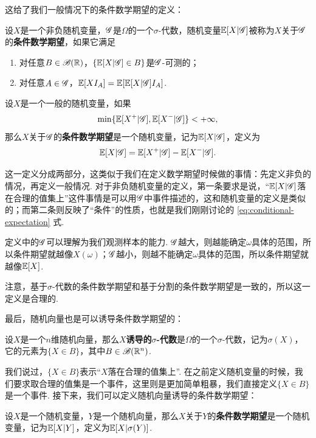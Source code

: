 这给了我们一般情况下的条件数学期望的定义：

\begin{definition}\label{definition:conditional-expectation-2}
设$X$是一个非负随机变量，$\mathscr{G}$是$\Omega$的一个$\sigma$-代数，随机变量$\mathbb{E}[X|\mathscr{G}]$被称为$X$关于$\mathscr{G}$的\textbf{条件数学期望}，如果它满足
\begin{enumerate}
    \item 对任意$B\in\mathscr{B}(\mathbb{R})$，$\{\mathbb{E}[X|\mathscr{G}]\in B\}$是$\mathscr{G}$-可测的；
    \item 对任意$A\in\mathscr{G}$，$\mathbb{E}[XI_A]=\mathbb{E}[\mathbb{E}[X|\mathscr{G}]I_A]$.
\end{enumerate}

设$X$是一个一般的随机变量，如果
\[\min\{\mathbb{E}[X^+|\mathscr{G}],\mathbb{E}[X^-|\mathscr{G}]\}<+\infty,\]
那么$X$关于$\mathscr{G}$的\textbf{条件数学期望}是一个随机变量，记为$\mathbb{E}[X|\mathscr{G}]$，定义为
\[\mathbb{E}[X|\mathscr{G}]=\mathbb{E}[X^+|\mathscr{G}]-\mathbb{E}[X^-|\mathscr{G}].\]
\end{definition}

这一定义分成两部分，这类似于我们在定义数学期望时候做的事情：先定义非负的情况，再定义一般情况. 对于非负随机变量的定义，第一条要求是说，“$\mathbb{E}[X|\mathscr{G}]$落在合理的值集上”这件事情是可以用$\mathscr{G}$中事件描述的，这和随机变量的定义是类似的；而第二条则反映了“条件”的性质，也就是我们刚刚讨论的 \eqref{eq:conditional-expectation} 式. 

定义中的$\mathscr{G}$可以理解为我们观测样本的能力. $\mathscr{G}$越大，则越能确定$\omega$具体的范围，所以条件期望就越像$X(\omega)$；$\mathscr{G}$越小，则越不能确定$\omega$具体的范围，所以条件期望就越像$\mathbb{E}[X]$.

注意，基于$\sigma$-代数的条件数学期望和基于分割的条件数学期望是一致的，所以这一定义是合理的. 

最后，随机向量也是可以诱导条件数学期望的：

\begin{definition}
设$X$是一个$n$维随机向量，那么\textbf{$X$诱导的$\sigma$-代数}是$\Omega$的一个$\sigma$-代数，记为$\sigma(X)$，它的元素为$\{X\in B\}$，其中$B\in\mathscr{B}(\mathbb{R}^n)$.
\end{definition}

我们说过，$\{X\in B\}$表示“$X$落在合理的值集上”. 在之前定义随机变量的时候，我们要求取合理的值集是一个事件，这里则是更加简单粗暴，我们直接定义$\{X\in B\}$是一个事件. 接下来，我们可以定义随机向量诱导的条件数学期望：

\begin{definition}[随机向量诱导的条件数学期望]\label{definition:conditional-expectation-vector}
设$X$是一个随机变量，$Y$是一个随机向量，那么$X$关于$Y$的\textbf{条件数学期望}是一个随机变量，记为$\mathbb{E}[X|Y]$，定义为$\mathbb{E}[X|\sigma(Y)]$.
\end{definition}

